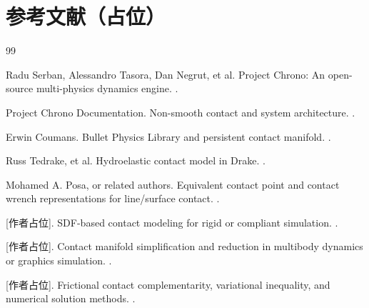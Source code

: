 \documentclass[UTF8,a4paper,11pt]{ctexart}
\begin{document}
\section*{参考文献（占位）}
\begin{thebibliography}{99}

Radu Serban, Alessandro Tasora, Dan Negrut, et al.
\newblock Project Chrono: An open-source multi-physics dynamics engine.
.

Project Chrono Documentation.
\newblock Non-smooth contact and system architecture.
.

Erwin Coumans.
\newblock Bullet Physics Library and persistent contact manifold.
.

Russ Tedrake, et al.
\newblock Hydroelastic contact model in Drake.
.

Mohamed A. Posa, or related authors.
\newblock Equivalent contact point and contact wrench representations for line/surface contact.
.

[作者占位].
\newblock SDF-based contact modeling for rigid or compliant simulation.
.

[作者占位].
\newblock Contact manifold simplification and reduction in multibody dynamics or graphics simulation.
\newblock [占位：补充接触流形约化相关论文].

[作者占位].
\newblock Frictional contact complementarity, variational inequality, and numerical solution methods.
.

\end{thebibliography}
\end{document}
